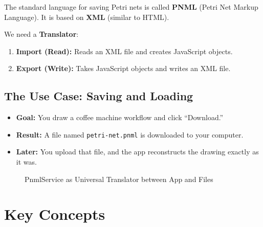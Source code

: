 \documentclass[a4paper,11pt,oneside]{report}
\begin{document}
The standard language for saving Petri nets is called \textbf{PNML} (Petri Net Markup Language). It is based on \textbf{XML} (similar to HTML).

We need a \textbf{Translator}:
\begin{enumerate}
    \item \textbf{Import (Read):} Reads an XML file and creates JavaScript objects.
    \item \textbf{Export (Write):} Takes JavaScript objects and writes an XML file.
\end{enumerate}

\subsection{The Use Case: Saving and Loading}

\begin{itemize}
    \item \textbf{Goal:} You draw a coffee machine workflow and click ``Download.''
    \item \textbf{Result:} A file named \texttt{petri-net.pnml} is downloaded to your computer.
    \item \textbf{Later:} You upload that file, and the app reconstructs the drawing exactly as it was.
\end{itemize}

\begin{figure}[H]
\centering
{}
\caption{PnmlService as Universal Translator between App and Files}
\label{fig:pnml-translator}
\end{figure}

\section{Key Concepts}
\end{document}
